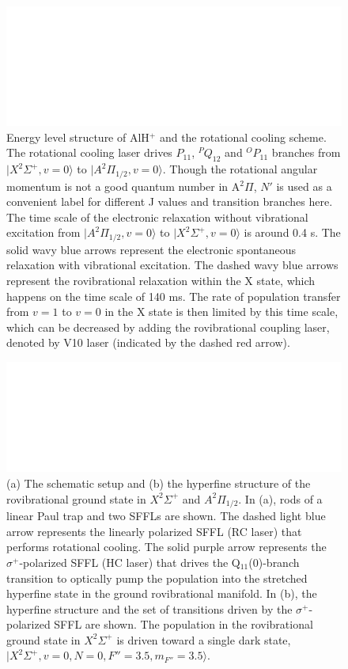\documentclass[nofootinbib,aip,jcp,reprint]{revtex4-1}
\begin{document}
\begin{figure}[!htp]
  \centering
  \includegraphics[width=14cm]{level_diagram_parity}
  \caption
  {Energy level structure of AlH$^+$ and the rotational cooling scheme. The rotational cooling laser drives $P_{11}$, $^PQ_{12}$ and $^OP_{11}$ branches from $\lvert X^2\Sigma^+, v=0\rangle$ to $\lvert A^2\Pi_{1/2}, v=0\rangle$. Though the rotational angular momentum is not a good quantum number in A$^{2}\Pi$, $N'$ is used as a convenient label for different J values and transition branches here. The time scale of the electronic relaxation without vibrational excitation from $\lvert A^2\Pi_{1/2}, v=0\rangle$ to $\lvert X^2\Sigma^+, v=0\rangle$ is around 0.4 {\micro}s. The solid wavy blue arrows represent the electronic spontaneous relaxation with vibrational excitation. The dashed wavy blue arrows represent the rovibrational relaxation within the X state, which happens on the time scale of 140 ms. The rate of population transfer from $v=1$ to $v=0$ in the X state is then limited by this time scale, which can be decreased by adding the rovibrational coupling laser, denoted by V10 laser (indicated by the dashed red arrow).
}\label{level_diagram_parity}
\end{figure}

\begin{figure}[!htp]
  \centering
  \includegraphics[width=14cm]{schematic_setup}
  \caption
  {(a) The schematic setup and (b) the hyperfine structure of the rovibrational ground state in $X^2\Sigma^+$ and $A^2\Pi_{1/2}$. In (a), rods of a linear Paul trap and two SFFLs are shown. The dashed light blue arrow represents the linearly polarized SFFL (RC laser) that performs rotational cooling. The solid purple arrow represents the $\sigma^+$-polarized SFFL (HC laser) that drives the Q$_{11}$(0)-branch transition to optically pump the population into the stretched hyperfine state in the ground rovibrational manifold. In (b), the hyperfine structure and the set of transitions driven by the $\sigma^+$-polarized SFFL are shown. The population in the rovibrational ground state in $X^2\Sigma^+$ is driven toward a single dark state, $\lvert X^2\Sigma^+, v=0, N=0, F''=3.5, m_{F''}=3.5\rangle$.
}\label{schematic_setup}
\end{figure}
\end{document}
